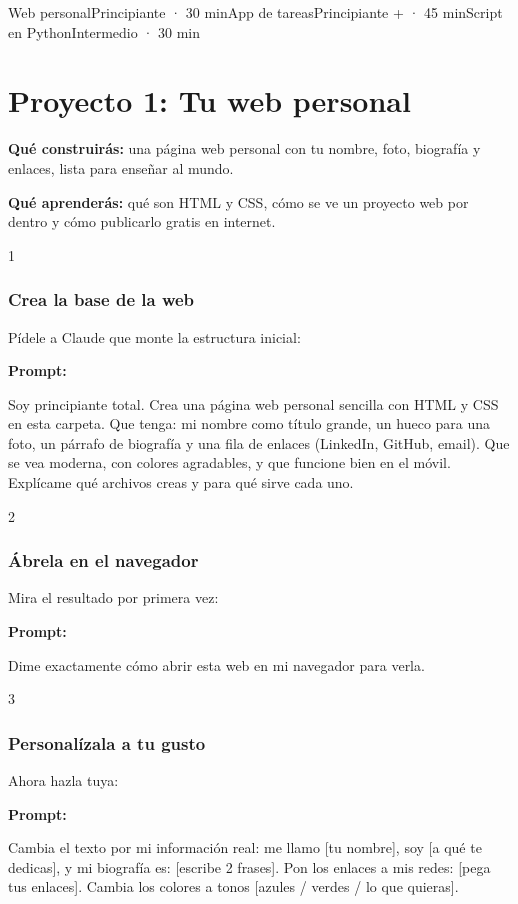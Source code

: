 \documentclass[11pt,a4paper]{report}
\begin{document}
Web personalPrincipiante · 30 minApp de tareasPrincipiante + · 45 minScript en PythonIntermedio · 30 min\section{ Proyecto 1: Tu web personal}

\textbf{Qué construirás:} una página web personal con tu nombre, foto, biografía y enlaces, lista para enseñar al mundo.

\textbf{Qué aprenderás:} qué son HTML y CSS, cómo se ve un proyecto web por dentro y cómo publicarlo gratis en internet.

1\subsubsection{Crea la base de la web}

Pídele a Claude que monte la estructura inicial:

\noindent\textbf{Prompt: }
\begin{codebox}
Soy principiante total. Crea una página web personal sencilla con HTML y CSS en esta carpeta. Que tenga: mi nombre como título grande, un hueco para una foto, un párrafo de biografía y una fila de enlaces (LinkedIn, GitHub, email). Que se vea moderna, con colores agradables, y que funcione bien en el móvil. Explícame qué archivos creas y para qué sirve cada uno.
\end{codebox}

2\subsubsection{Ábrela en el navegador}

Mira el resultado por primera vez:

\noindent\textbf{Prompt: }
\begin{codebox}
Dime exactamente cómo abrir esta web en mi navegador para verla.
\end{codebox}

3\subsubsection{Personalízala a tu gusto}

Ahora hazla tuya:

\noindent\textbf{Prompt: }
\begin{codebox}
Cambia el texto por mi información real: me llamo [tu nombre], soy [a qué te dedicas], y mi biografía es: [escribe 2 frases]. Pon los enlaces a mis redes: [pega tus enlaces]. Cambia los colores a tonos [azules / verdes / lo que quieras].
\end{codebox}
\end{document}

